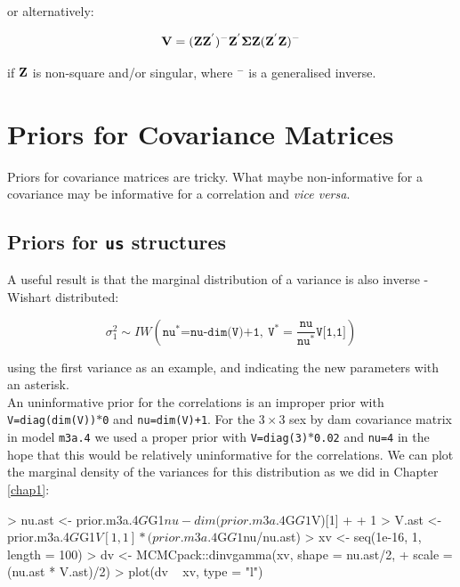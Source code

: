 \documentclass{article}
\begin{document}
or alternatively: 

\begin{equation}
{\bf V} = ({\bf Z}{\bf Z}^{'})^{-}{\bf Z}^{'}{\bm \Sigma}{\bf Z}({\bf Z}^{'}{\bf Z})^{-}
\end{equation}

if ${\bf Z}$ is non-square and/or singular, where \texttt{$^{-}$} is a generalised inverse.\\

 
\section{Priors for Covariance Matrices}
\label{VCVprior-sec}

Priors for covariance matrices are tricky. What maybe non-informative for a covariance may be informative for a correlation and \emph{vice versa}.

\subsection{Priors for \texttt{us} structures}

A useful result is that the marginal distribution of a variance is also inverse - Wishart distributed:

\begin{displaymath}
\sigma^{2}_{1} \sim IW\left(\texttt{nu}^{\ast}\texttt{=nu-dim(V)+1},\ \texttt{V}^{\ast}=\frac{\texttt{nu}}{\texttt{nu}^{\ast}}\texttt{V[1,1]}\right)
\end{displaymath}

using the first variance as an example, and indicating the new parameters with an asterisk.\\

An uninformative prior for the correlations is an improper prior with \texttt{V=diag(dim(V))$\ast$0} and \texttt{nu=dim(V)+1}. For the $3\times3$ sex by dam covariance matrix in model \texttt{m3a.4} we used a proper prior with \texttt{V=diag(3)$\ast$0.02} and \texttt{nu=4} in the hope that this would be relatively uninformative for the correlations. We can plot the marginal density of the variances for this distribution as we did in Chapter \ref{chap1}:

\begin{Schunk}
\begin{Sinput}
> nu.ast <- prior.m3a.4$G$G1$nu - dim(prior.m3a.4$G$G1$V)[1] + 
+     1
> V.ast <- prior.m3a.4$G$G1$V[1, 1] * (prior.m3a.4$G$G1$nu/nu.ast)
> xv <- seq(1e-16, 1, length = 100)
> dv <- MCMCpack::dinvgamma(xv, shape = nu.ast/2, 
+     scale = (nu.ast * V.ast)/2)
> plot(dv ~ xv, type = "l")
\end{Sinput}
\end{Schunk}
\end{document}
